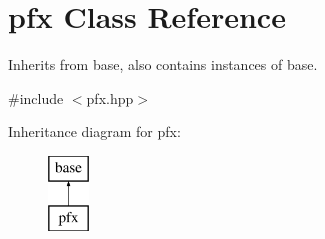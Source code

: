 \hypertarget{classpfx}{\section{pfx Class Reference}
\label{classpfx}
}


Inherits from base, also contains instances of base.  




{\ttfamily \#include $<$pfx.\-hpp$>$}

Inheritance diagram for pfx\-:\begin{figure}[H]
\begin{center}
\leavevmode
\includegraphics[height=2.000000cm]{classpfx}
\end{center}
\end{figure}
